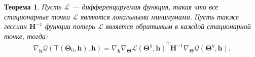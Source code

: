 \documentclass[12pt, twoside]{article}
\newtheorem{theorem}{Теорема}
\begin{document}
\begin{theorem}
Пусть $\mathcal{L}$ --- дифференцируемая функция, такая что все стационарные точки $\mathcal{L}$ являются локальными минимумами. Пусть также гессиан $\mathbf{H}^{-1}$ функции потерь $\mathcal{L}$ является обратимым в каждой стационарной точке, тогда:
\begin{equation}
\label{eq:1}
\begin{aligned}
    \nabla_{\mathbf{h}}\mathcal{Q}\left(\mathsf{T}\left(\bm{\Theta}_{0}, \mathbf{h}\right), \mathbf{h}\right) = \nabla_{\mathbf{h}}\nabla_{\bm{\Theta}}\mathcal{L}\left(\bm{\Theta}^{\eta}, \mathbf{h}\right)^{\mathsf{T}}\mathbf{H}^{-1}\nabla_{\bm{\Theta}}\mathcal{Q}\left(\bm{\Theta}^{\eta}, \mathbf{h}\right).
\end{aligned}
\end{equation}
\end{theorem}
\end{document}
